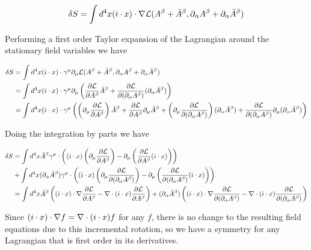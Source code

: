\begin{align}\label{eqn:rotationCurrents:hoo1}
\delta S = \int d^4 x (i \cdot x) \cdot \nabla \mathcal{L}( A^\beta + \bar{A}^\beta, \partial_\alpha A^\beta + \partial_\alpha \bar{A}^\beta)
\end{align}

Performing a first order Taylor expansion of the Lagrangian around the stationary field variables we have

\begin{align*}
\delta S 
&= \int d^4 x (i \cdot x) \cdot \gamma^\mu \partial_\mu \mathcal{L}( A^\beta + \bar{A}^\beta, \partial_\alpha A^\beta + \partial_\alpha \bar{A}^\beta) \\
&= \int d^4 x (i \cdot x) \cdot \gamma^\mu \partial_\mu \left(
\frac{\partial {\mathcal{L}}}{\partial {A^\beta}} \bar{A}^\beta
+\frac{\partial {\mathcal{L}}}{\partial {(\partial_\alpha A^\beta)}} (\partial_\alpha \bar{A}^\beta)
\right) \\
&= \int d^4 x (i \cdot x) \cdot \gamma^\mu \left(
\left(\partial_\mu \frac{\partial {\mathcal{L}}}{\partial {A^\beta}}\right) \bar{A}^\beta
+\frac{\partial {\mathcal{L}}}{\partial {A^\beta}} \partial_\mu \bar{A}^\beta
+\left(\partial_\mu \frac{\partial {\mathcal{L}}}{\partial {(\partial_\alpha A^\beta)}}\right) (\partial_\alpha \bar{A}^\beta)
+\frac{\partial {\mathcal{L}}}{\partial {(\partial_\alpha A^\beta)}} \partial_\mu (\partial_\alpha \bar{A}^\beta)
\right) \\
\end{align*}

Doing the integration by parts we have

\begin{align*}
\delta S 
&= 
\int d^4 x \bar{A}^\beta \gamma^\mu \cdot 
\left(
(i \cdot x) 
\left(\partial_\mu \frac{\partial {\mathcal{L}}}{\partial {A^\beta}}\right) 
-\partial_\mu \left(\frac{\partial {\mathcal{L}}}{\partial {A^\beta}} (i \cdot x)\right)
\right) 
\\
&+
\int d^4 x 
(\partial_\alpha \bar{A}^\beta) 
\gamma^\mu \cdot 
\left(
(i \cdot x) 
\left(\partial_\mu \frac{\partial {\mathcal{L}}}{\partial {(\partial_\alpha A^\beta)}}\right) 
-\partial_\mu \left( \frac{\partial {\mathcal{L}}}{\partial {(\partial_\alpha A^\beta)}} (i \cdot x) \right)
\right) 
\\
&=
\int d^4 x \bar{A}^\beta 
\left(
(i \cdot x) \cdot \nabla
\frac{\partial {\mathcal{L}}}{\partial {A^\beta}}
- \nabla \cdot (i \cdot x) \frac{\partial {\mathcal{L}}}{\partial {A^\beta}} 
\right) 
+
(\partial_\alpha \bar{A}^\beta)
\left(
(i \cdot x) \cdot \nabla
\frac{\partial {\mathcal{L}}}{\partial {(\partial_\alpha A^\beta)}}
- \nabla \cdot (i \cdot x) \frac{\partial {\mathcal{L}}}{\partial {(\partial_\alpha A^\beta)}} 
\right) 
\end{align*}

Since $(i \cdot x) \cdot \nabla f = \nabla \cdot (i \cdot x) f$ for any $f$, there is no change to the resulting field equations due to this incremental rotation, so we have a symmetry for any Lagrangian that is first order in its derivatives.

\EndArticle
